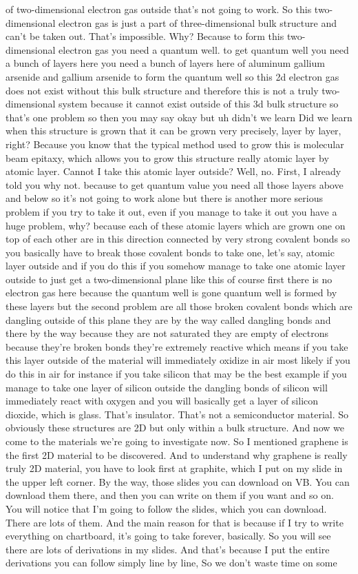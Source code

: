 of two-dimensional electron gas outside that's not going to work. So this two-dimensional electron gas is just a part of three-dimensional bulk structure and can't be taken out. That's impossible. Why? Because to form this two-dimensional electron gas you need a quantum well. to get quantum well you need a bunch of layers here you need a bunch of layers here of aluminum gallium arsenide and gallium arsenide to form the quantum well so this 2d electron gas does not exist without this bulk structure and therefore this is not a truly two-dimensional system because it cannot exist outside of this 3d bulk structure so that's one problem so then you may say okay but uh didn't we learn Did we learn when this structure is grown that it can be grown very precisely, layer by layer, right? Because you know that the typical method used to grow this is molecular beam epitaxy, which allows you to grow this structure really atomic layer by atomic layer. Cannot I take this atomic layer outside? Well, no. First, I already told you why not. because to get quantum value you need all those layers above and below so it's not going to work alone but there is another more serious problem if you try to take it out, even if you manage to take it out you have a huge problem, why? because each of these atomic layers which are grown one on top of each other are in this direction connected by very strong covalent bonds so you basically have to break those covalent bonds to take one, let's say, atomic layer outside and if you do this if you somehow manage to take one atomic layer outside to just get a two-dimensional plane like this of course first there is no electron gas here because the quantum well is gone quantum well is formed by these layers but the second problem are all those broken covalent bonds which are dangling outside of this plane they are by the way called dangling bonds and there by the way because they are not saturated they are empty of electrons because they're broken bonds they're extremely reactive which means if you take this layer outside of the material will immediately oxidize in air most likely if you do this in air for instance if you take silicon that may be the best example if you manage to take one layer of silicon outside the dangling bonds of silicon will immediately react with oxygen and you will basically get a layer of silicon dioxide, which is glass. That's insulator. That's not a semiconductor material. So obviously these structures are 2D but only within a bulk structure. And now we come to the materials we're going to investigate now. So I mentioned graphene is the first 2D material to be discovered. And to understand why graphene is really truly 2D material, you have to look first at graphite, which I put on my slide in the upper left corner. By the way, those slides you can download on VB. You can download them there, and then you can write on them if you want and so on. You will notice that I'm going to follow the slides, which you can download. There are lots of them. And the main reason for that is because if I try to write everything on chartboard, it's going to take forever, basically. So you will see there are lots of derivations in my slides. And that's because I put the entire derivations you can follow simply line by line, So we don't waste time on some 